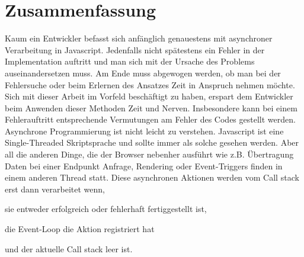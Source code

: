 \section{Zusammenfassung}

Kaum ein Entwickler befasst sich anfänglich genauestens mit asynchroner Verarbeitung in Javascript. Jedenfalls nicht spätestens ein Fehler in der Implementation auftritt und man sich mit der Ursache des Problems auseinandersetzen muss. Am Ende muss abgewogen werden, ob man bei der Fehlersuche oder beim Erlernen des Ansatzes Zeit in Anspruch nehmen möchte. Sich mit dieser Arbeit im Vorfeld beschäftigt zu haben, erspart dem Entwickler beim Anwenden dieser Methoden Zeit und Nerven. Insbesondere kann bei einem Fehlerauftritt entsprechende Vermutungen am Fehler des Codes gestellt werden. Asynchrone Programmierung ist nicht leicht zu verstehen. Javascript ist eine Single-Threaded Skriptsprache und sollte immer als solche gesehen werden. Aber all die anderen Dinge, die der Browser nebenher ausführt wie z.B. Übertragung Daten bei einer Endpunkt Anfrage, Rendering oder Event-Triggers finden in einem anderen Thread statt. Diese asynchronen Aktionen werden vom Call stack erst dann verarbeitet wenn, 

\begin{description}
\item sie entweder erfolgreich oder fehlerhaft fertiggestellt ist,
\item die Event-Loop die Aktion registriert hat
\item und der aktuelle Call stack leer ist.
\end{description}


